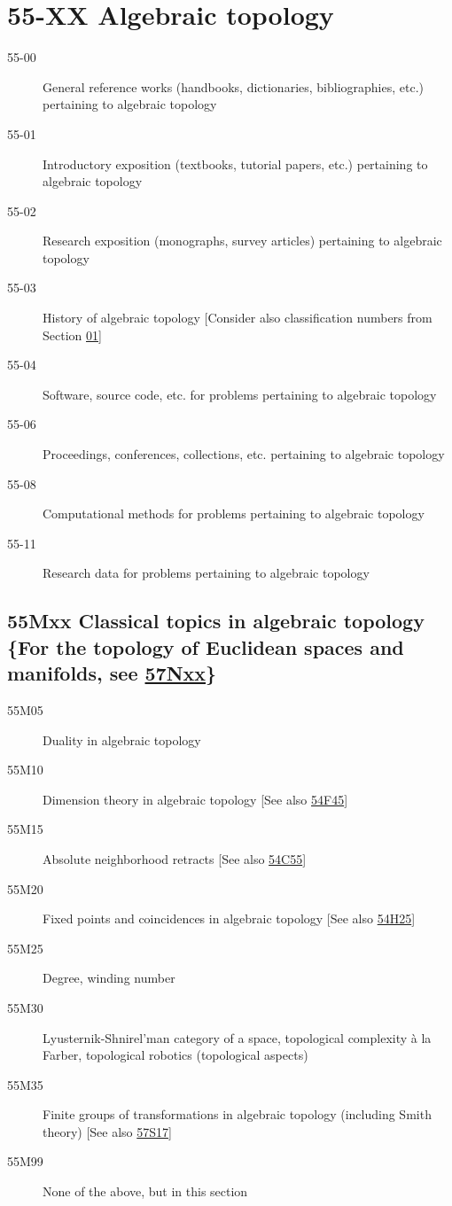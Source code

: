 \section*{55-XX Algebraic topology }\label{55-XX}
\begin{description}
\item [55-00]\label{55-00} General reference works (handbooks, dictionaries, bibliographies, etc.) pertaining to algebraic topology
\item [55-01]\label{55-01} Introductory exposition (textbooks, tutorial papers, etc.) pertaining to algebraic topology
\item [55-02]\label{55-02} Research exposition (monographs, survey articles) pertaining to algebraic topology
\item [55-03]\label{55-03} History of algebraic topology [Consider also classification numbers from Section \hyperref[01-XX]{01}]
\item [55-04]\label{55-04} Software, source code, etc. for problems pertaining to algebraic topology
\item [55-06]\label{55-06} Proceedings, conferences, collections, etc. pertaining to algebraic topology
\item [55-08]\label{55-08} Computational methods for problems pertaining to algebraic topology
\item [55-11]\label{55-11} Research data for problems pertaining to algebraic topology
\end{description}
\subsection*{55Mxx  Classical topics in algebraic topology \{For the topology of Euclidean spaces and manifolds, see \hyperref[57Nxx]{57Nxx}\} }\label{55Mxx}
\begin{description}  
\item [55M05]\label{55M05} Duality in algebraic topology
\item [55M10]\label{55M10} Dimension theory in algebraic topology [See also \hyperref[54F45]{54F45}]
\item [55M15]\label{55M15} Absolute neighborhood retracts [See also \hyperref[54C55]{54C55}]
\item [55M20]\label{55M20} Fixed points and coincidences in algebraic topology [See also \hyperref[54H25]{54H25}]
\item [55M25]\label{55M25} Degree, winding number
\item [55M30]\label{55M30} Lyusternik-Shnirel'man category of a space, topological complexity \`a la Farber, topological robotics (topological aspects)
\item [55M35]\label{55M35} Finite groups of transformations in algebraic topology (including Smith theory) [See also \hyperref[57S17]{57S17}]
\item [55M99]\label{55M99} None of the above, but in this section
\end{description}
